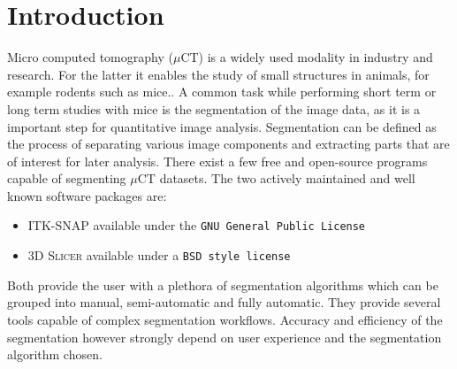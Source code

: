 


\clearpage

\section{Introduction}
\begin{body}
	Micro computed tomography ($\mu$CT) is a widely used modality in industry and research. For the latter it enables the study of small structures in animals, for example rodents such as mice.\cite{percianoInsight3DMicroCT2017}.
	A common task while performing short term or long term studies with mice is the segmentation of the image data, as it is a important step for quantitative image analysis\cite{sheppardTechniquesHelicalScanning2014}. Segmentation can be defined as the process of separating various image components and extracting parts that are of interest for later analysis\cite{percianoInsight3DMicroCT2017}.
	\newline
	There exist a few free and open-source programs capable of segmenting $\mu$CT datasets.
	The two actively maintained and well known\cite{mandoliniComparisonThree3D2022,virziComprehensiveReview3D2020} software packages are:
	\begin{itemize}
		\item[\ding{108}] \textsc{ITK-SNAP}\cite{yushkevichUserguided3DActive2006} available under the \texttt{GNU General Public License}\cite{licenseGnuGeneralPublic1989}
		\item[\ding{108}] \textsc{3D Slicer}\cite{kikinis3DSlicerPlatform2014} available under a \texttt{BSD style license}\cite{gaudeulPublicProvisionPrivate2005}
	\end{itemize}
	Both provide the user with a plethora of segmentation algorithms which can be grouped into manual, semi-automatic and fully automatic. They provide several tools capable of complex segmentation workflows\cite{percianoInsight3DMicroCT2017}.
	Accuracy and efficiency of the segmentation however strongly depend on user experience and the segmentation algorithm chosen\cite{mandoliniComparisonThree3D2022,aydinRELIABILITYREPRODUCIBILITYTIMEEFFICIENCY2020}.
\end{body}

